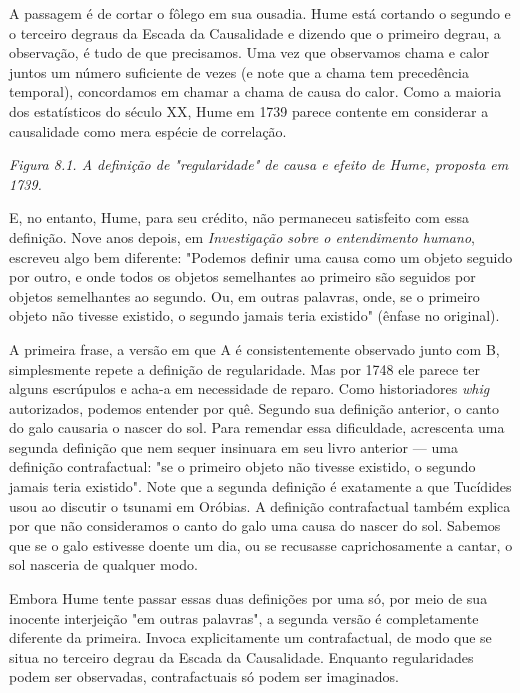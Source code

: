\documentclass[11pt,a5paper,twoside]{book}
\begin{document}
A passagem é de cortar o fôlego em sua ousadia. Hume está cortando o segundo e o terceiro degraus da Escada da Causalidade e dizendo que o primeiro degrau, a observação, é tudo de que precisamos. Uma vez que observamos chama e calor juntos um número suficiente de vezes (e note que a chama tem precedência temporal), concordamos em chamar a chama de causa do calor. Como a maioria dos estatísticos do século XX, Hume em 1739 parece contente em considerar a causalidade como mera espécie de correlação.

\textit{Figura 8.1. A definição de "regularidade" de causa e efeito de Hume, proposta em 1739.}

E, no entanto, Hume, para seu crédito, não permaneceu satisfeito com essa definição. Nove anos depois, em \textit{Investigação sobre o entendimento humano}, escreveu algo bem diferente: "Podemos definir uma causa como um objeto seguido por outro, e onde todos os objetos semelhantes ao primeiro são seguidos por objetos semelhantes ao segundo. Ou, em outras palavras, onde, se o primeiro objeto não tivesse existido, o segundo jamais teria existido" (ênfase no original).

A primeira frase, a versão em que A é consistentemente observado junto com B, simplesmente repete a definição de regularidade. Mas por 1748 ele parece ter alguns escrúpulos e acha-a em necessidade de reparo. Como historiadores \textit{whig} autorizados, podemos entender por quê. Segundo sua definição anterior, o canto do galo causaria o nascer do sol. Para remendar essa dificuldade, acrescenta uma segunda definição que nem sequer insinuara em seu livro anterior — uma definição contrafactual: "se o primeiro objeto não tivesse existido, o segundo jamais teria existido". Note que a segunda definição é exatamente a que Tucídides usou ao discutir o tsunami em Oróbias. A definição contrafactual também explica por que não consideramos o canto do galo uma causa do nascer do sol. Sabemos que se o galo estivesse doente um dia, ou se recusasse caprichosamente a cantar, o sol nasceria de qualquer modo.

Embora Hume tente passar essas duas definições por uma só, por meio de sua inocente interjeição "em outras palavras", a segunda versão é completamente diferente da primeira. Invoca explicitamente um contrafactual, de modo que se situa no terceiro degrau da Escada da Causalidade. Enquanto regularidades podem ser observadas, contrafactuais só podem ser imaginados.
\end{document}
